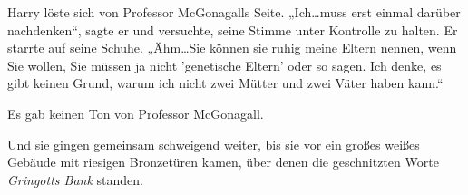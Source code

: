 Harry löste sich von Professor McGonagalls Seite. „Ich…muss erst einmal darüber nachdenken“, sagte er und versuchte, seine Stimme unter Kontrolle zu halten. Er starrte auf seine Schuhe. „Ähm…Sie können sie ruhig meine Eltern nennen, wenn Sie wollen, Sie müssen ja nicht 'genetische Eltern' oder so sagen. Ich denke, es gibt keinen Grund, warum ich nicht zwei Mütter und zwei Väter haben kann.“

Es gab keinen Ton von Professor McGonagall.

Und sie gingen gemeinsam schweigend weiter, bis sie vor ein großes weißes Gebäude mit riesigen Bronzetüren kamen, über denen die geschnitzten Worte \emph{Gringotts Bank} standen.

